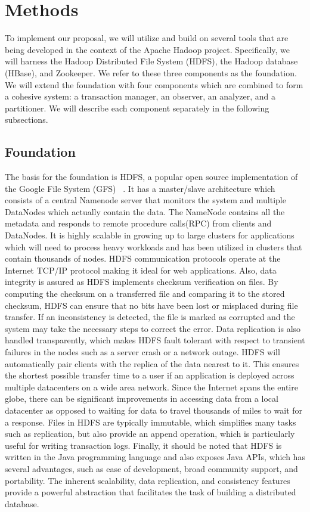 \documentclass[10pt,final,journal]{IEEEtran}
\begin{document}
\section{Methods}
To implement our proposal, we will utilize and build on several tools that are being developed in the context of the Apache Hadoop project. Specifically, we will harness the Hadoop Distributed File System (HDFS), the Hadoop database (HBase), and Zookeeper. We refer to these three components as the foundation. We will extend the foundation with four components which are combined to form a cohesive system: a transaction manager, an observer, an analyzer, and a partitioner. We will describe each component separately in the following subsections.

\subsection{Foundation}
The basis for the foundation is HDFS, a popular open source implementation of the Google File System (GFS) ~\cite{Ghemawat:2003:GFS:1165389.945450}. It has a master/slave architecture which consists of a central Namenode server that monitors the system and multiple DataNodes which actually contain the data. The NameNode contains all the metadata and responds to remote procedure calls(RPC) from clients and DataNodes. It is highly scalable in growing up to large clusters for applications which will need to process heavy workloads and has been utilized in clusters that contain thousands of nodes.  HDFS communication protocols operate at the Internet TCP/IP protocol making it ideal for web applications. Also, data integrity is assured as HDFS implements checksum verification on files. By computing the checksum on a transferred file and comparing it to the stored checksum, HDFS can ensure that no bits have been lost or misplaced during file transfer. If an inconsistency is detected, the file is marked as corrupted and the system may take the necessary steps to correct the error.  Data replication is also handled transparently, which makes HDFS fault tolerant with respect to transient failures in the nodes such as a server crash or a network outage. HDFS will automatically pair clients with the replica of the data nearest to it. This ensures the shortest possible transfer time to a user if an application is deployed across multiple datacenters on a wide area network. Since the Internet spans the entire globe, there can be significant improvements in accessing data from a local datacenter as opposed to waiting for data to travel thousands of miles to wait for a response. Files in HDFS are typically immutable, which simplifies many tasks such as replication, but also provide an append operation, which is particularly useful for writing transaction logs. Finally, it should be noted that HDFS is written in the Java programming language and also exposes Java APIs, which has several advantages, such as ease of development, broad community support, and portability. The inherent scalability, data replication, and consistency features provide a powerful abstraction that facilitates the task of building a distributed database.
\end{document}
